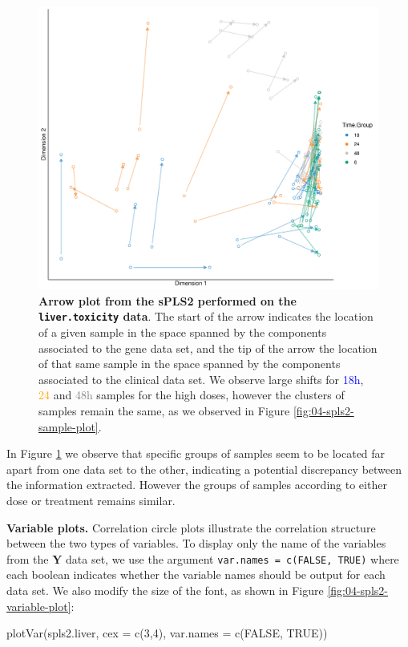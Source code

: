 \documentclass[
]{book}
\newenvironment{Shaded}{\begin{snugshade}}{\end{snugshade}}
\newcommand{\AttributeTok}[1]{\textcolor[rgb]{0.77,0.63,0.00}{#1}}
\newcommand{\ConstantTok}[1]{\textcolor[rgb]{0.00,0.00,0.00}{#1}}
\newcommand{\DecValTok}[1]{\textcolor[rgb]{0.00,0.00,0.81}{#1}}
\newcommand{\FunctionTok}[1]{\textcolor[rgb]{0.00,0.00,0.00}{#1}}
\newcommand{\NormalTok}[1]{#1}
\begin{document}
\begin{figure}

{\centering \includegraphics[width=0.7\linewidth]{Figures/PLS/04-spls2-arrow-plot-1} 

}

\caption{\textbf{Arrow plot from the sPLS2 performed on the \texttt{liver.toxicity} data}. The start of the arrow indicates the location of a given sample in the space spanned by the components associated to the gene data set, and the tip of the arrow the location of that same sample in the space spanned by the components associated to the clinical data set. We observe large shifts for \textcolor{blue}{18h}, \textcolor{orange}{24} and \textcolor{grey}{48h} samples for the high doses, however the clusters of samples remain the same, as we observed in Figure \ref{fig:04-spls2-sample-plot}.}\label{fig:04-spls2-arrow-plot}
\end{figure}



In Figure \ref{fig:04-spls2-arrow-plot} we observe that specific groups of samples seem to be located far apart from one data set to the other, indicating a potential discrepancy between the information extracted. However the groups of samples according to either dose or treatment remains similar.

\textbf{Variable plots.}
Correlation circle plots illustrate the correlation structure between the two types of variables. To display only the name of the variables from the \(\boldsymbol{Y}\) data set, we use the argument \texttt{var.names\ =\ c(FALSE,\ TRUE)} where each boolean indicates whether the variable names should be output for each data set. We also modify the size of the font, as shown in Figure \ref{fig:04-spls2-variable-plot}:

\begin{Shaded}
\begin{Highlighting}[]
\FunctionTok{plotVar}\NormalTok{(spls2.liver, }\AttributeTok{cex =} \FunctionTok{c}\NormalTok{(}\DecValTok{3}\NormalTok{,}\DecValTok{4}\NormalTok{), }\AttributeTok{var.names =} \FunctionTok{c}\NormalTok{(}\ConstantTok{FALSE}\NormalTok{, }\ConstantTok{TRUE}\NormalTok{))}
\end{Highlighting}
\end{Shaded}
\end{document}
